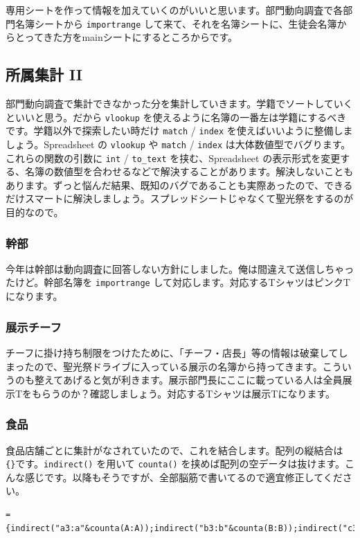 \documentclass[dvipdfmx,jb5]{jreport}
\begin{document}
専用シートを作って情報を加えていくのがいいと思います。部門動向調査で各部門名簿シートから \texttt{importrange} して来て、それを名簿シートに、生徒会名簿からとってきた方をmainシートにするところからです。

\subsection{所属集計 II}
部門動向調査で集計できなかった分を集計していきます。学籍でソートしていくといいと思う。だから \texttt{vlookup} を使えるように名簿の一番左は学籍にするべきです。学籍以外で探索したい時だけ \texttt{match} / \texttt{index} を使えばいいように整備しましょう。Spreadsheet の \texttt{vlookup} や \texttt{match} / \texttt{index} は大体数値型でバグります。これらの関数の引数に \texttt{int} / \texttt{to\_text} を挟む、Spreadsheet の表示形式を変更する、名簿の数値型を合わせるなどで解決することがあります。解決しないこともあります。ずっと悩んだ結果、既知のバグであることも実際あったので、できるだけスマートに解決しましょう。スプレッドシートじゃなくて聖光祭をするのが目的なので。

\subsubsection{幹部}
今年は幹部は動向調査に回答しない方針にしました。俺は間違えて送信しちゃったけど。幹部名簿を \texttt{importrange} して対応します。対応するTシャツはピンクTになります。

\subsubsection{展示チーフ}
チーフに掛け持ち制限をつけたために、「チーフ・店長」等の情報は破棄してしまったので、聖光祭ドライブに入っている展示の名簿から持ってきます。こういうのも整えてあげると気が利きます。展示部門長にここに載っている人は全員展示Tをもらうのか？確認しましょう。対応するTシャツは展示Tになります。

\subsubsection{食品}
食品店舗ごとに集計がなされていたので、これを結合します。配列の縦結合は \texttt{\{\}}です。\texttt{indirect()} を用いて \texttt{counta()} を挟めば配列の空データは抜けます。こんな感じです。以降もそうですが、全部脳筋で書いてるので適宜修正してください。

\begin{lstlisting}
={indirect("a3:a"&counta(A:A));indirect("b3:b"&counta(B:B));indirect("c3:c"&counta(C:C));indirect("d3:d"&counta(D:D));indirect("e3:e"&counta(E:E));indirect("f3:f"&counta(F:F));indirect("g3:g"&counta(G:G))}
\end{lstlisting}
\end{document}
